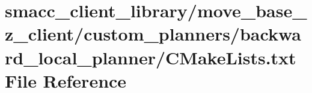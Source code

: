\hypertarget{client__library_2move__base__z__client_2custom__planners_2backward__local__planner_2CMakeLists_8txt}{}\section{smacc\+\_\+client\+\_\+library/move\+\_\+base\+\_\+z\+\_\+client/custom\+\_\+planners/backward\+\_\+local\+\_\+planner/\+C\+Make\+Lists.txt File Reference}
\label{client__library_2move__base__z__client_2custom__planners_2backward__local__planner_2CMakeLists_8txt}
